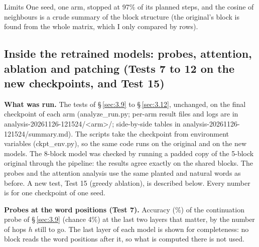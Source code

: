 \documentclass[paper=a4,fontsize=11pt,DIV=11,parskip=half,headings=small,numbers=noendperiod]{scrartcl}
\DeclareRobustCommand{\lead}[1]{\textsf{\bfseries\color{accent}#1}}
\DeclareRobustCommand{\code}[1]{{\fontseries{m}\ttfamily #1}}
\begin{document}
\begin{limbox}{Limits}
One seed, one arm, stopped at 97\% of its planned steps, and the cosine of neighbours is a crude summary of the
block structure (the original’s block is found from the whole matrix, which I only compared by rows).
\end{limbox}

\subsection{Inside the retrained models: probes, attention, ablation and patching (Tests 7 to 12 on the new
checkpoints, and Test 15)}\label{sec:3.16}
\lead{What was run.} The tests of \S\,\ref{sec:3.9} to \S\,\ref{sec:3.12}, unchanged, on the final checkpoint of
each arm (\code{analyze\_\allowbreak{}run.\allowbreak{}py}; per-arm result files and logs are in
\code{analysis-\allowbreak{}20261126-\allowbreak{}121524/\allowbreak{}<arm>/}; side-by-side tables in
\code{analysis-\allowbreak{}20261126-\allowbreak{}121524/\allowbreak{}summary.\allowbreak{}md}). The scripts
take the checkpoint from environment variables (\code{ckpt\_\allowbreak{}env.\allowbreak{}py}), so the same code
runs on the original and on the new models. The 8-block model was checked by running a padded copy of the
5-block original through the pipeline: the results agree exactly on the shared blocks. The probes and the
attention analysis use the same planted and natural words as before. A new test, Test 15 (greedy ablation), is
described below. Every number is for one checkpoint of one seed.

\lead{Probes at the word positions (Test 7).} Accuracy (\%) of the continuation probe of \S\,\ref{sec:3.9}
(chance 4\%) at the last two layers that matter, by the number of hops $h$ still to go. The last layer of each
model is shown for completeness: no block reads the word positions after it, so what is computed there is not
used.
\end{document}
